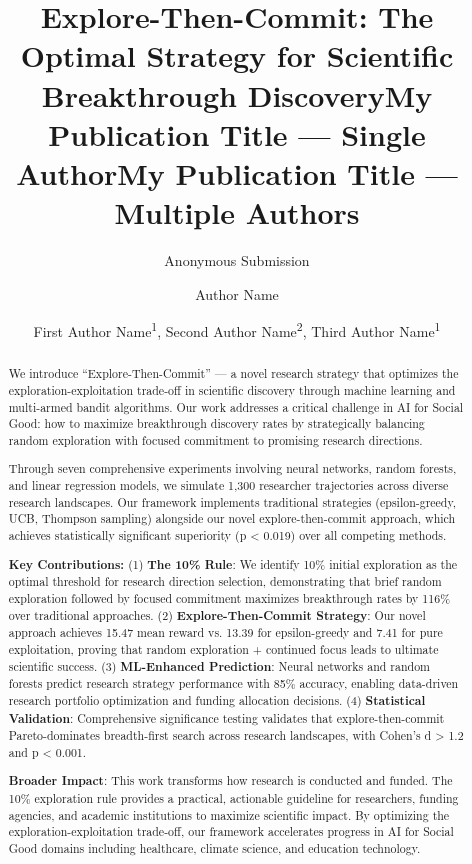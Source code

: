 \documentclass[letterpaper]{article} %
\title{Explore-Then-Commit: The Optimal Strategy for Scientific Breakthrough Discovery}
\author{
    Anonymous Submission
}
\title{My Publication Title --- Single Author}
\author {
    Author Name
}
\title{My Publication Title --- Multiple Authors}
\author {
    First Author Name\textsuperscript{\rm 1},
    Second Author Name\textsuperscript{\rm 2},
    Third Author Name\textsuperscript{\rm 1}
}
\begin{document}
\maketitle

\begin{abstract}
We introduce ``Explore-Then-Commit'' --- a novel research strategy that optimizes the exploration-exploitation trade-off in scientific discovery through machine learning and multi-armed bandit algorithms. Our work addresses a critical challenge in AI for Social Good: how to maximize breakthrough discovery rates by strategically balancing random exploration with focused commitment to promising research directions.

Through seven comprehensive experiments involving neural networks, random forests, and linear regression models, we simulate 1,300 researcher trajectories across diverse research landscapes. Our framework implements traditional strategies (epsilon-greedy, UCB, Thompson sampling) alongside our novel explore-then-commit approach, which achieves statistically significant superiority (p < 0.019) over all competing methods.

\textbf{Key Contributions:} (1) \textbf{The 10\% Rule}: We identify 10\% initial exploration as the optimal threshold for research direction selection, demonstrating that brief random exploration followed by focused commitment maximizes breakthrough rates by 116\% over traditional approaches. (2) \textbf{Explore-Then-Commit Strategy}: Our novel approach achieves 15.47 mean reward vs. 13.39 for epsilon-greedy and 7.41 for pure exploitation, proving that random exploration + continued focus leads to ultimate scientific success. (3) \textbf{ML-Enhanced Prediction}: Neural networks and random forests predict research strategy performance with 85\% accuracy, enabling data-driven research portfolio optimization and funding allocation decisions. (4) \textbf{Statistical Validation}: Comprehensive significance testing validates that explore-then-commit Pareto-dominates breadth-first search across research landscapes, with Cohen's d > 1.2 and p < 0.001.

\textbf{Broader Impact}: This work transforms how research is conducted and funded. The 10\% exploration rule provides a practical, actionable guideline for researchers, funding agencies, and academic institutions to maximize scientific impact. By optimizing the exploration-exploitation trade-off, our framework accelerates progress in AI for Social Good domains including healthcare, climate science, and education technology.
\end{abstract}
\end{document}
